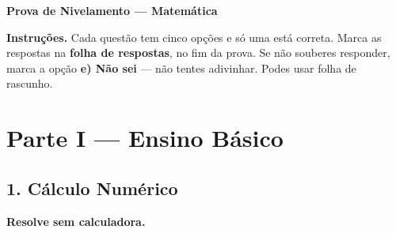 \documentclass[12pt,a4paper]{article}
\begin{document}
\begin{center}
    {\Large \textbf{Prova de Nivelamento — Matemática}}
\end{center}

\vspace{0.2cm}

\textbf{Instruções.} Cada questão tem cinco opções e só uma está correta.
Marca as respostas na \textbf{folha de respostas}, no fim da prova.
Se não souberes responder, marca a opção \textbf{e) Não sei} — não tentes adivinhar.
Podes usar folha de rascunho.

\section*{Parte I — Ensino Básico}

\subsection*{1. Cálculo Numérico}

\textbf{Resolve sem calculadora.}
\end{document}
